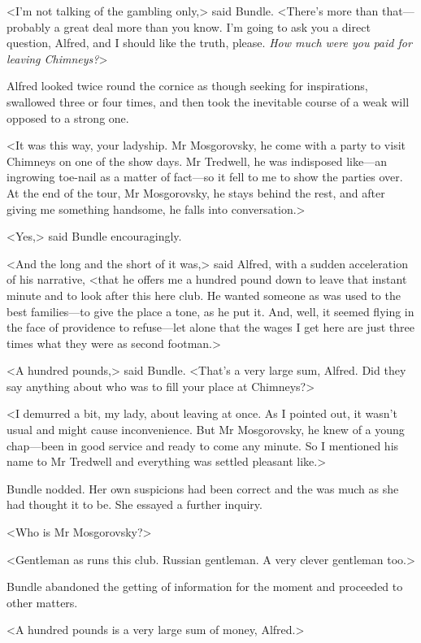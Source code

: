 <I'm not talking of the gambling only,> said Bundle. <There's more than that—probably a great deal more than you know. I'm going to ask you a direct question, Alfred, and I should like the truth, please. \emph{How much were you paid for leaving Chimneys?}>

Alfred looked twice round the cornice as though seeking for inspirations, swallowed three or four times, and then took the inevitable course of a weak will opposed to a strong one.

<It was this way, your ladyship. Mr Mosgorovsky, he come with a party to visit Chimneys on one of the show days. Mr Tredwell, he was indisposed like—an ingrowing toe-nail as a matter of fact—so it fell to me to show the parties over. At the end of the tour, Mr Mosgorovsky, he stays behind the rest, and after giving me something handsome, he falls into conversation.>

<Yes,> said Bundle encouragingly.

<And the long and the short of it was,> said Alfred, with a sudden acceleration of his narrative, <that he offers me a hundred pound down to leave that instant minute and to look after this here club. He wanted someone as was used to the best families—to give the place a tone, as he put it. And, well, it seemed flying in the face of providence to refuse—let alone that the wages I get here are just three times what they were as second footman.>

<A hundred pounds,> said Bundle. <That's a very large sum, Alfred. Did they say anything about who was to fill your place at Chimneys?>

<I demurred a bit, my lady, about leaving at once. As I pointed out, it wasn't usual and might cause inconvenience. But Mr Mosgorovsky, he knew of a young chap—been in good service and ready to come any minute. So I mentioned his name to Mr Tredwell and everything was settled pleasant like.>

Bundle nodded. Her own suspicions had been correct and the  was much as she had thought it to be. She essayed a further inquiry.

<Who is Mr Mosgorovsky?>

<Gentleman as runs this club. Russian gentleman. A very clever gentleman too.>

Bundle abandoned the getting of information for the moment and proceeded to other matters.

<A hundred pounds is a very large sum of money, Alfred.>

